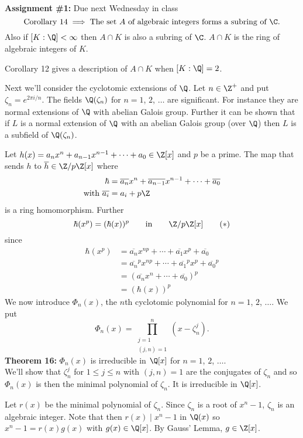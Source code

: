 \textbf{Assignment \#1:} Due next Wednesday in class
\[ \text{Corollary 14} \implies \text{The set $A$ of algebraic integers forms a subring of $\C$.} \]
Also if $[K:\Q]<\infty$ then $A\cap K$ is also a subring of $\C$.  $A\cap K$ is the ring of algebraic integers of $K$.

Corollary 12 gives a description of $A\cap K$ when $[K:\Q]=2$.

Next we'll consider the cyclotomic extensions of $\Q$.  Let $n\in\Z^+$ and put $\zeta_n=e^{2\pi i/n}$.  The fields $\Q(\zeta_n)$ for $n=1$, $2$, $\dotsc$ are significant.  For instance they are normal extensions of $\Q$ with abelian Galois group.  Further it can be shown that if $L$ is a normal extension of $\Q$ with an abelian Galois group (over $\Q$) then $L$ is a subfield of $\Q(\zeta_n)$.

Let $h(x)=a_nx^n+a_{n-1}x^{n-1}+\dotsb+a_0\in\Z[x]$ and $p$ be a prime.  The map that sends $h$ to $\overline{h}\in\Z/p\Z[x]$ where
\begin{align*}
\hbar &= \overline{a_n}x^n + \overline{a_{n-1}}x^{n-1} + \dotsb + \overline{a_0} \\
\text{with } \overline{a_i} &= a_i+p\Z
\end{align*}
is a ring homomorphism.  Further
\[ \hbar(x^p) = (\hbar(x))^p \qquad\text{in}\qquad \Z/p\Z[x] \tag{$*$} \]
since
\begin{align*}
\hbar(x^p) &= \overline{a_n}x^{np} + \dotsb + \overline{a_1}x^p + \overline{a_0} \\
&= \overline{a_n}^px^{np} + \dotsb + \overline{a_1}^p x^p + \overline{a_0}^p \\
&= (\overline{a_n}x^n+\dotsb+\overline{a_0})^p \\
&= (\hbar(x))^p
\end{align*}
We now introduce $\Phi_n(x)$, the $n$th cyclotomic polynomial for $n=1$, $2$, $\dotsc$.  We put
\[ \Phi_n(x) = \prod_{\substack{j=1\\(j,n)=1}}^n (x-\zeta_n^j) . \]
\textbf{Theorem 16:} $\Phi_n(x)$ is irreducible in $\Q[x]$ for $n=1$, $2$, $\dotsc$. \\
\pf We'll show that $\zeta_n^j$ for $1\leq j\leq n$ with $(j,n)=1$ are the conjugates of $\zeta_n$ and so $\Phi_n(x)$ is then the minimal polynomial of $\zeta_n$.  It is irreducible in $\Q[x]$.

Let $r(x)$ be the minimal polynomial of $\zeta_n$.  Since $\zeta_n$ is a root of $x^n-1$, $\zeta_n$ is an algebraic integer.  Note that then $r(x)\mid x^n-1$ in $\Q(x)$ so $x^n-1=r(x)g(x)$ with $g(x)\in\Q[x]$.  By Gauss' Lemma, $g\in\Z[x]$.

